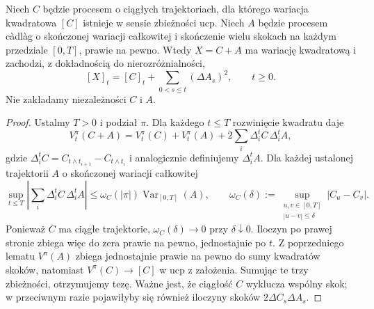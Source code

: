 \begin{twierdzenie}
\label{thm:finite-variation-jumps-bracket}
Niech $C$ będzie procesem o ciągłych trajektoriach, dla którego
wariacja kwadratowa $[C]$ istnieje w sensie zbieżności ucp.
Niech $A$ będzie procesem c\`adl\`ag o skończonej wariacji
całkowitej i skończenie wielu skokach na każdym przedziale
$[0,T]$, prawie na pewno. Wtedy $X=C+A$ ma wariację
kwadratową i zachodzi, z dokładnością do nierozróżnialności,
\[
[X]_t=[C]_t+\sum_{0<s\le t}(\Delta A_s)^2,
\qquad t\ge0.
\]
Nie zakładamy niezależności $C$ i $A$.
\end{twierdzenie}
\begin{proof}
Ustalmy $T>0$ i podział $\pi$. Dla każdego $t\le T$
rozwinięcie kwadratu daje
\[
V_t^\pi(C+A)=V_t^\pi(C)+V_t^\pi(A)
 +2\sum_i\Delta_i^tC\,\Delta_i^tA,
\]
gdzie $\Delta_i^tC=C_{t\wedge t_{i+1}}-C_{t\wedge t_i}$
i analogicznie definiujemy $\Delta_i^tA$. Dla każdej
ustalonej trajektorii $A$ o skończonej wariacji całkowitej
\[
\sup_{t\le T}\left|\sum_i\Delta_i^tC\,\Delta_i^tA\right|
\le \omega_C(|\pi|)\operatorname{Var}_{[0,T]}(A),
\qquad
\omega_C(\delta):=
\sup_{\substack{u,v\in[0,T]\\|u-v|\le\delta}}|C_u-C_v|.
\]
Ponieważ $C$ ma ciągłe trajektorie, $\omega_C(\delta)\to0$
przy $\delta\downarrow0$. Iloczyn po prawej stronie zbiega
więc do zera prawie na pewno, jednostajnie po $t$.
Z poprzedniego lematu $V^\pi(A)$ zbiega jednostajnie
prawie na pewno do sumy kwadratów skoków, natomiast
$V^\pi(C)\to[C]$ w ucp z założenia.
Sumując te trzy zbieżności, otrzymujemy tezę.
Ważne jest, że ciągłość $C$ wyklucza wspólny skok;
w przeciwnym razie pojawiłyby się również iloczyny
skoków $2\Delta C_s\Delta A_s$.
\end{proof}

